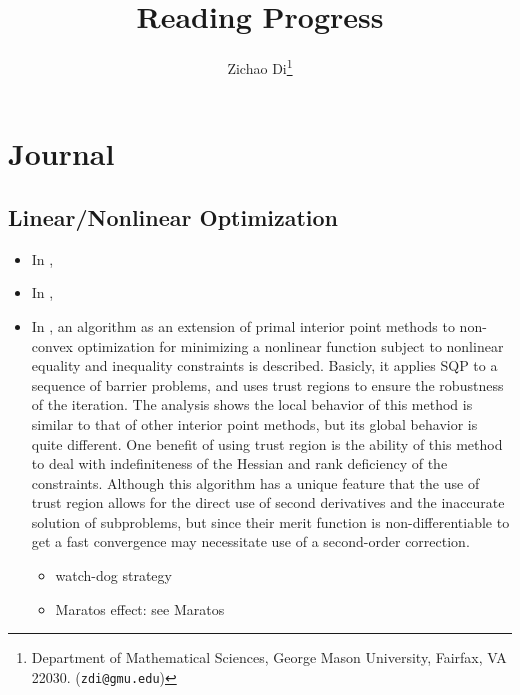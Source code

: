 \documentclass{article}
\title{\bf Reading Progress}
\author{Zichao Di\thanks{Department of Mathematical Sciences, George Mason University,
  Fairfax, VA 22030. ({\tt zdi@gmu.edu})}}
\begin{document}
  \maketitle 



\section{Journal}
\subsection{Linear/Nonlinear Optimization}
\begin{itemize}
\item In  \cite{L1}, 
\item In \cite{NA},
\item In \cite{RJ1}, an algorithm  as an extension of primal interior point methods to non-convex optimization for minimizing a nonlinear function subject to nonlinear equality and inequality constraints is described. Basicly, it applies SQP to a sequence of barrier problems, and uses trust regions to ensure the robustness of the iteration. The analysis shows the local behavior of this method is similar to that of other interior point methods, but its global behavior is quite different. One benefit of using trust region is the ability of this method to deal with indefiniteness of the Hessian and rank deficiency of the constraints. Although this algorithm has a unique feature that the use of trust region allows for the direct use of second derivatives and the inaccurate solution of subproblems, but since their merit function is non-differentiable  to get a fast convergence may necessitate use of a second-order correction.
\begin{itemize}
\item watch-dog strategy
\item Maratos effect: see Maratos \cite{MAR1}
\end{itemize}
\end{itemize} 
\end{document}
